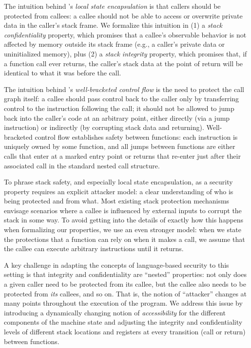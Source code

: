 \documentclass[acmsmall,review,anonymous]{acmart}\settopmatter{printfolios=true,printccs=false,printacmref=false}
\begin{document}
The intuition behind \citeauthor{Skorstengaard+19}'s {\em
  local state encapsulation} is that callers should be protected from
callees: a callee should not be able to access or overwrite private data
in the caller's stack frame.
%
We formalize this intuition in (1) a {\em stack confidentiality}
property, which promises that a callee's observable behavior is not affected
by memory outside its stack frame (e.g., a caller's private data or
uninitialized memory), plus (2) a {\em stack integrity} property,
which promises that, if a function call ever returns, the caller's stack
data at the point of return will be identical to what it was before the
call.

The intuition behind \citeauthor{Skorstengaard+19}'s {\em
  well-bracketed control flow} is the need to protect the call graph
itself: a callee should pass control back to the caller only by
transferring control to the instruction
following the call; it should not be allowed to jump back into the
caller's code at an arbitrary point, either directly (via a jump
instruction) or indirectly (by corrupting stack data and
returning). Well-bracketed control flow establishes safety between
functions: each instruction is uniquely owned by some function, and
all jumps between functions are either calls that enter at a marked
entry point or returns that re-enter just after their associated call
in the standard nested call structure.  

To phrase stack safety, and especially local state encapsulation, as a
security property requires an explicit attacker model: a clear
understanding of who is being protected and from what. Most existing
stack protection mechanisms envisage scenarios where a callee is
influenced by external inputs to corrupt the stack in some way. To
avoid getting into the details of exactly how this happens when
formalizing our properties, we use an even stronger model: when we
state the protections that a function can rely on when it makes a
call, we assume that the callee can execute arbitrary instructions
until it returns.

A key challenge in adapting the concepts of language-based security to this
setting is that integrity and confidentiality are ``nested'' properties: not
only does a given caller need to be protected from its callee, but the callee
also needs to be protected from {\em its} callees, and so on. That is, the notion
of ``attacker'' changes at many points throughout the execution of the program.
We address
this issue by introducing a dynamically changing notion of {\em accessibility} for
the different components of the machine state and adjusting the integrity
and confidentiality levels of different stack locations and registers at
every transition (call or return) between functions.
\end{document}
